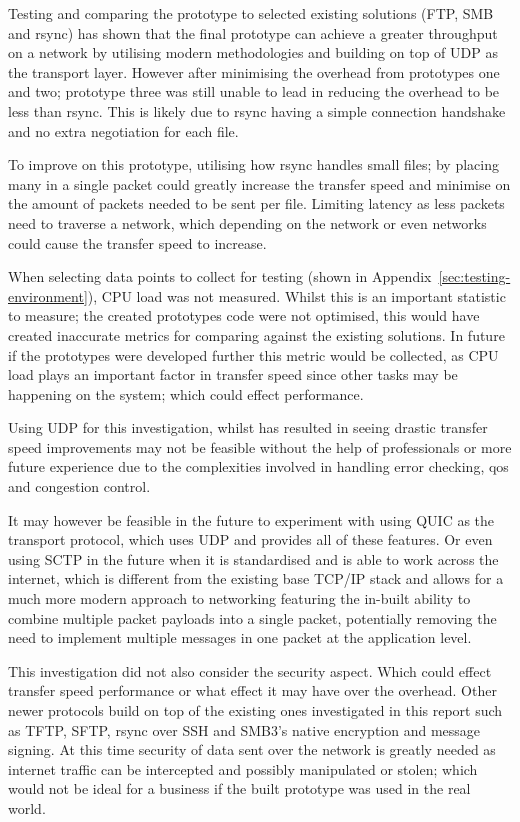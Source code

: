 Testing and comparing the prototype to selected existing solutions (FTP, SMB and rsync) has shown that the final prototype can achieve a greater throughput on a network by utilising modern methodologies and building on top of UDP as the transport layer. However after minimising the overhead from prototypes one and two; prototype three was still unable to lead in reducing the overhead to be less than rsync. This is likely due to rsync having a simple connection handshake and no extra negotiation for each file.

To improve on this prototype, utilising how rsync handles small files; by placing many in a single packet could greatly increase the transfer speed and minimise on the amount of packets needed to be sent per file. Limiting latency as less packets need to traverse a network, which depending on the network or even networks could cause the transfer speed to increase.

When selecting data points to collect for testing (shown in Appendix~\ref{sec:testing-environment}), CPU load was not measured. Whilst this is an important statistic to measure; the created prototypes code were not optimised, this would have created inaccurate metrics for comparing against the existing solutions. In future if the prototypes were developed further this metric would be collected, as CPU load plays an important factor in transfer speed since other tasks may be happening on the system; which could effect performance.

Using UDP for this investigation, whilst has resulted in seeing drastic transfer speed improvements may not be feasible without the help of professionals or more future experience due to the complexities involved in handling error checking, \acrfull{qos} and congestion control.

It may however be feasible in the future to experiment with using QUIC as the transport protocol, which uses UDP and provides all of these features. Or even using SCTP in the future when it is standardised and is able to work across the internet, which is different from the existing base TCP/IP stack and allows for a much more modern approach to networking featuring the in-built ability to combine multiple packet payloads into a single packet, potentially removing the need to implement multiple messages in one packet at the application level.

This investigation did not also consider the security aspect. Which could effect transfer speed performance or what effect it may have over the overhead. Other newer protocols build on top of the existing ones investigated in this report such as TFTP, SFTP, rsync over SSH and SMB3's native encryption and message signing. At this time security of data sent over the network is greatly needed as internet traffic can be intercepted and possibly manipulated or stolen; which would not be ideal for a business if the built prototype was used in the real world.

